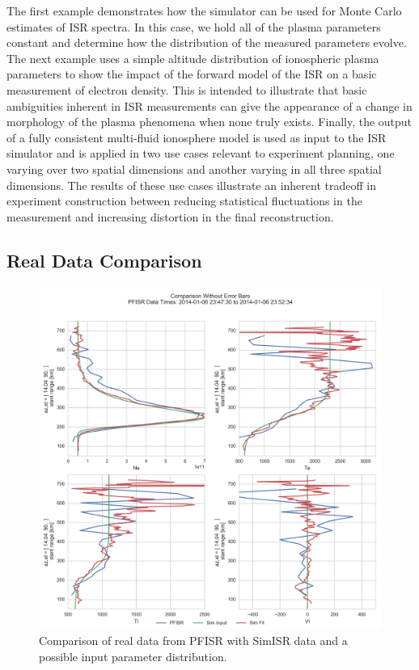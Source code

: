 The first example demonstrates how the simulator can be used for Monte Carlo estimates of ISR spectra. In this case, we hold all of the plasma parameters constant and determine how the distribution of the measured parameters evolve. The next example uses a simple altitude distribution of ionospheric plasma parameters to show the impact of the forward model of the ISR on a basic measurement of electron density. This is intended to illustrate that basic ambiguities inherent in ISR measurements can give the appearance of a change in morphology of the plasma phenomena when none truly exists. Finally, the output of a fully consistent multi-fluid ionosphere model is used as input to the ISR simulator and is applied in two use cases relevant to experiment planning, one varying over two spatial dimensions and another varying in all three spatial dimensions. The results of these use cases illustrate an inherent tradeoff in experiment construction between reducing statistical fluctuations in the measurement and increasing distortion in the final reconstruction. 

\subsection{Real Data Comparison}


\begin{figure}[h!]
\centering
\includegraphics[width=4.5in]{Paramcomp}
\caption{Comparison of real data from PFISR with SimISR data and a possible input parameter distribution.}
\label{fig:simisrparamcomp}
\end{figure}

